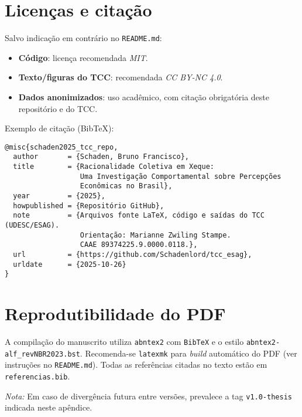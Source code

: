 \begin{apendicesenv}
\section{Licenças e citação}
Salvo indicação em contrário no \texttt{README.md}:
\begin{itemize}
  \item \textbf{Código}: licença recomendada \textit{MIT}.
  \item \textbf{Texto/figuras do TCC}: recomendada \textit{CC BY-NC 4.0}.
  \item \textbf{Dados anonimizados}: uso acadêmico, com citação obrigatória deste repositório e do TCC.
\end{itemize}

\noindent Exemplo de citação (Bib\TeX):
\begin{verbatim}
@misc{schaden2025_tcc_repo,
  author       = {Schaden, Bruno Francisco},
  title        = {Racionalidade Coletiva em Xeque:
                  Uma Investigação Comportamental sobre Percepções
                  Econômicas no Brasil},
  year         = {2025},
  howpublished = {Repositório GitHub},
  note         = {Arquivos fonte LaTeX, código e saídas do TCC (UDESC/ESAG).
                  Orientação: Marianne Zwiling Stampe.
                  CAAE 89374225.9.0000.0118.},
  url          = {https://github.com/Schadenlord/tcc_esag},
  urldate      = {2025-10-26}
}
\end{verbatim}

\section{Reprodutibilidade do PDF}
A compilação do manuscrito utiliza \texttt{abntex2} com \texttt{BibTeX} e o estilo \texttt{abntex2-alf\_revNBR2023.bst}. Recomenda-se \texttt{latexmk} para \emph{build} automático do PDF (ver instruções no \texttt{README.md}). Todas as referências citadas no texto estão em \texttt{referencias.bib}.

\bigskip
\noindent\emph{Nota:} Em caso de divergência futura entre versões, prevalece a tag \texttt{v1.0-thesis} indicada neste apêndice.

\end{apendicesenv}
